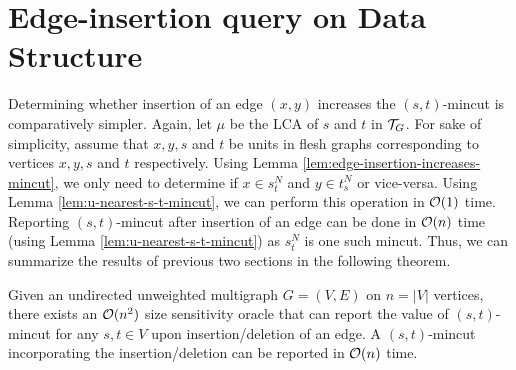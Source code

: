 

\section{Edge-insertion query on Data Structure}

Determining whether insertion of an edge $(x,y)$ increases the $(s,t)$-mincut is comparatively simpler. Again, let $\mu$ be the LCA of $s$ and $t$ in ${\cal T}_G$. For sake of simplicity, assume that $x,y,s$ and $t$  be units in flesh graphs corresponding to vertices $x,y,s$ and $t$ respectively. Using Lemma \ref{lem:edge-insertion-increases-mincut}, we only need to determine if $x \in s_t^N$ and $y \in t_s^N$ or vice-versa. Using Lemma \ref{lem:u-nearest-s-t-mincut}, we can perform this operation in ${\cal O}(1)$ time. Reporting $(s,t)$-mincut after insertion of an edge can be done in ${\cal O}(n)$ time (using Lemma \ref{lem:u-nearest-s-t-mincut}) as $s_t^N$ is one such mincut. Thus, we can summarize the results of previous two sections in the following theorem.

\begin{theorem}
Given an undirected unweighted multigraph $G=(V,E)$ on $n=|V|$ vertices, there exists an
${\cal O}(n^2)$ size sensitivity oracle that can report the value of $(s,t)$-mincut for any $s,t \in V$ upon insertion/deletion of an edge. A $(s,t)$-mincut incorporating the insertion/deletion can be reported in ${\cal O}(n)$ time.
\label{thm:O(n^2)-size-data-structure}
\end{theorem}